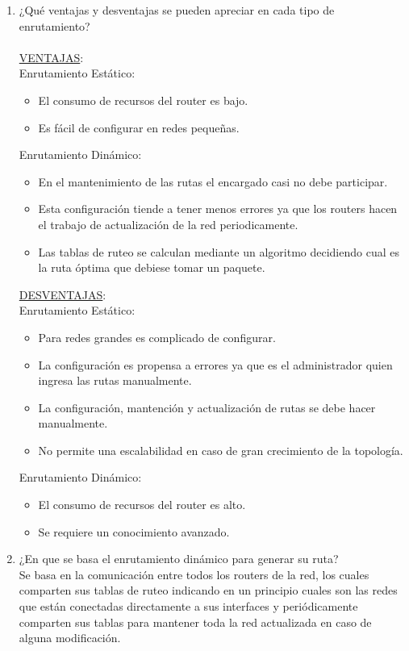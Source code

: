 \documentclass{udpreport}
\begin{document}
	\begin{enumerate}
	    \item ¿Qué ventajas y desventajas se pueden apreciar en cada tipo de enrutamiento?\\\\
	    \underline {VENTAJAS}:\\
	    Enrutamiento Estático:
	    \begin{itemize}
	    	\item El consumo de recursos del router es bajo.
	    	\item Es fácil de configurar en redes pequeñas.
	    \end{itemize}
	    Enrutamiento Dinámico:
	    \begin{itemize}
	    	\item En el mantenimiento de las rutas el encargado casi no debe participar.
	    	\item Esta configuración tiende a tener menos errores ya que los routers hacen el trabajo de actualización de la red periodicamente.
	    	\item Las tablas de ruteo se calculan mediante un algoritmo decidiendo cual es la ruta óptima que debiese tomar un paquete.
	    \end{itemize}
	    \underline{DESVENTAJAS}:\\
	    Enrutamiento Estático:
	    \begin{itemize}
	    	\item Para redes grandes es complicado de configurar.
	    	\item La configuración es propensa a errores ya que es el administrador quien ingresa las rutas manualmente.
	    	\item La configuración, mantención y actualización de rutas se debe hacer manualmente.
	    	\item No permite una escalabilidad en caso de gran crecimiento de la topología.
	    \end{itemize}
	    Enrutamiento Dinámico:
	    \begin{itemize}
	    	\item El consumo de recursos del router es alto.
	    	\item Se requiere un conocimiento avanzado.
	    \end{itemize}
            \item ¿En que se basa el enrutamiento dinámico para generar su ruta?\\
            	Se basa en la comunicación entre todos los routers de la red, los cuales comparten sus tablas de ruteo indicando en un principio cuales son las redes que están conectadas directamente a sus interfaces y periódicamente comparten sus tablas para mantener toda la red actualizada en caso de alguna modificación.
            	

\end{enumerate}
\end{document}
